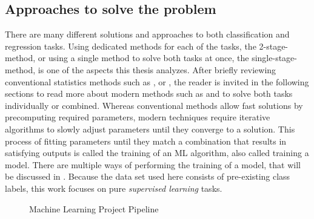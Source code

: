\subsection{Approaches to solve the problem}\label{subsec:approaches-to-solve-the-problem}
There are many different solutions and approaches to both classification and regression tasks.
Using dedicated methods for each of the tasks, the 2-stage-method, or using a single method to solve both tasks at once, the single-stage-method, is one of the aspects this thesis analyzes.
After briefly reviewing conventional statistics methods such as , or ,
the reader is invited in the following sections to read more about modern methods such as  and  to solve both tasks individually or combined.
Whereas conventional methods allow fast solutions by precomputing required parameters, modern techniques require iterative algorithms to slowly adjust parameters until they converge to a solution.
This process of fitting parameters until they match a combination that results in satisfying outputs is called the training of an ML algorithm, also called training a model.
There are multiple ways of performing the training of a model, that will be discussed in .
Because the data set used here consists of pre-existing class labels, this work focuses on pure \textit{supervised learning} tasks.

\begin{wrapfigure}{r}{0.5\textwidth}
    \vspace{-0.5cm}
    \centering
    \caption{Machine Learning Project Pipeline}
    \label{fig:pipeline}
\end{wrapfigure}
